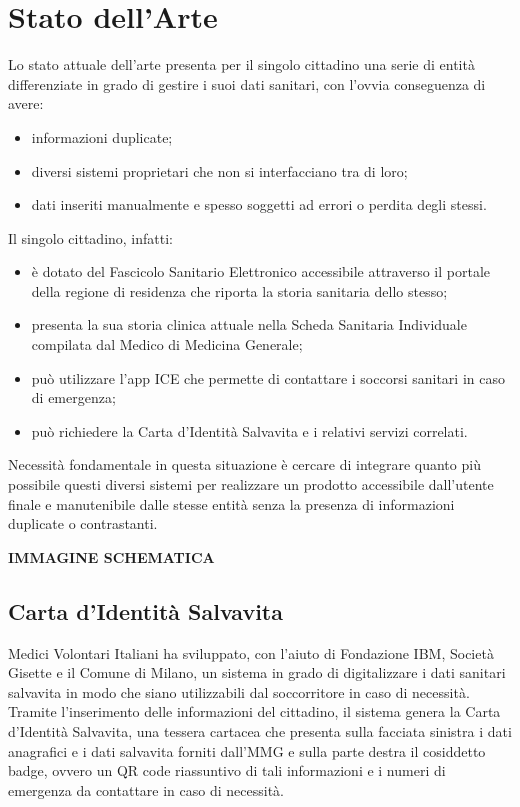 \documentclass[12pt,a4paper,twoside,openright,titlepage]{book}
\begin{document}
\section{Stato dell'Arte}
Lo stato attuale dell'arte presenta per il singolo cittadino una serie di entità differenziate in grado di gestire i suoi dati sanitari, con l'ovvia conseguenza di avere:
\begin{itemize}
\item informazioni duplicate;
\item diversi sistemi proprietari che non si interfacciano tra di loro;
\item dati inseriti manualmente e spesso soggetti ad errori o perdita degli stessi.
\end{itemize}
Il singolo cittadino, infatti:
\begin{itemize}
\item è dotato del Fascicolo Sanitario Elettronico accessibile attraverso il portale della regione di residenza che riporta la storia sanitaria dello stesso;
\item presenta la sua storia clinica attuale nella Scheda Sanitaria Individuale compilata dal Medico di Medicina Generale;
\item può utilizzare l'app ICE che permette di contattare i soccorsi sanitari in caso di emergenza;
\item può richiedere la Carta d'Identità Salvavita e i relativi servizi correlati.
\end{itemize}
Necessità fondamentale in questa situazione è cercare di integrare quanto più possibile questi diversi sistemi per realizzare un prodotto accessibile dall'utente finale e manutenibile dalle stesse entità senza la presenza di informazioni duplicate o contrastanti.\newline

\textbf{IMMAGINE SCHEMATICA}

\subsection{Carta d'Identità Salvavita}
Medici Volontari Italiani ha sviluppato, con l'aiuto di Fondazione IBM, Società Gisette e il Comune di Milano, un sistema in grado di digitalizzare i dati sanitari salvavita in modo che siano utilizzabili dal soccorritore in caso di necessità. Tramite l'inserimento delle informazioni del cittadino, il sistema genera la Carta d'Identità Salvavita, una tessera cartacea che presenta sulla facciata sinistra i dati anagrafici e i dati salvavita forniti dall'MMG e sulla parte destra il cosiddetto badge, ovvero un QR code riassuntivo di tali informazioni e i numeri di emergenza da contattare in caso di necessità.
\end{document}
